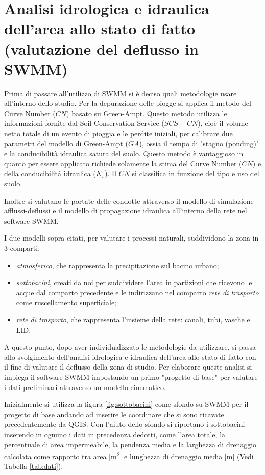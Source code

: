 \chapter{Analisi idrologica e idraulica dell’area allo stato di fatto (valutazione del deflusso in SWMM)}\label{cap:progettoBase}
Prima di passare all'utilizzo di SWMM si è deciso quali metodologie usare all'interno dello studio.
Per la depurazione delle piogge si applica il metodo del Curve Number ($CN$) basato su Green-Ampt. 
Questo metodo utilizza le informazioni fornite dal Soil Conservation Service ($SCS-CN$), cioè il volume netto totale di un evento di pioggia e le perdite iniziali, per calibrare due parametri del modello di Green-Ampt ($GA$), ossia il tempo di "stagno (ponding)" e la conducibilità idraulica satura del suolo.
Questo metodo è vantaggioso in quanto per essere applicato richiede solamente la stima del Curve Number ($CN$) e della conducibilità idraulica ($K_s$). 
Il $CN$ si classifica in funzione del tipo e uso del suolo. 

Inoltre si valutano le portate delle condotte attraverso il modello di simulazione afflussi-deflussi e il modello di propagazione idraulica all'interno della rete nel software SWMM.

I due modelli sopra citati, per valutare i processi naturali, suddividono la zona in 3 comparti:
\begin{itemize}
\item \emph{atmosferico}, che rappresenta la precipitazione sul bacino urbano;
\item \emph{sottobacini}, creati da noi per suddividere l'area in partizioni che ricevono le acque dal comparto precedente e le indirizzano nel comparto \emph{rete di trasporto} come ruscellamento superficiale;
\item \emph{rete di trasporto}, che rappresenta l'insieme della rete: canali, tubi, vasche e LID.
\end{itemize}
A questo punto, dopo aver individualizzato le metodologie da utilizzare, si passa allo svolgimento dell'analisi idrologica e idraulica dell'area allo stato di fatto con il fine di valutare il deflusso della zona di studio.
Per elaborare queste analisi si impiega il software SWMM impostando un primo "progetto di base" per valutare i dati preliminari attraverso un modello cinematico.

Inizialmente si utilizza la figura \ref{fig:sottobacini} come sfondo su SWMM per il progetto di base andando ad inserire le coordinare che si sono ricavate precedentemente da QGIS.
Con l'aiuto dello sfondo si riportano i sottobacini inserendo in ognuno i dati in precedenza dedotti, come l'area totale, la percentuale di area impermeabile, la pendenza media e la larghezza di drenaggio calcolata come rapporto tra area [\si{\square\metre}] e lunghezza di drenaggio media [\si{\metre}] (Vedi Tabella \ref{tab:dati}).

